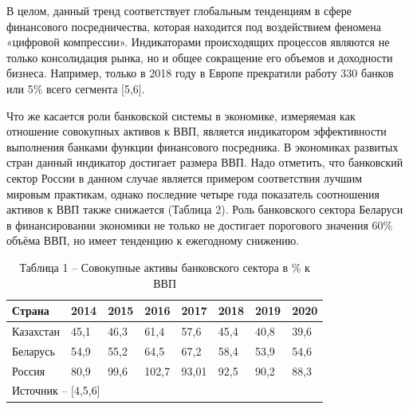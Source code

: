 \begin{multicols}{2}
В целом, данный тренд соответствует глобальным тенденциям в сфере
финансового посредничества, которая находится под воздействием феномена
«цифровой компрессии». Индикаторами происходящих процессов являются не
только консолидация рынка, но и общее сокращение его объемов и
доходности бизнеса. Например, только в 2018 году в Европе прекратили
работу 330 банков или 5\% всего сегмента {[}5,6{]}.

Что же касается роли банковской системы в экономике, измеряемая как
отношение совокупных активов к ВВП, является индикатором эффективности
выполнения банками функции финансового посредника. В экономиках развитых
стран данный индикатор достигает размера ВВП. Надо отметить, что
банковский сектор России в данном случае является примером соответствия
лучшим мировым практикам, однако последние четыре года показатель
соотношения активов к ВВП также снижается (Таблица 2). Роль банковского
сектора Беларуси в финансировании экономики не только не достигает
порогового значения 60\% объёма ВВП, но имеет тенденцию к ежегодному
снижению.
\end{multicols}

\begin{table}[H]
\caption*{Таблица 1 -- Совокупные активы банковского сектора в \% к ВВП}
\centering
\begin{tabular}{|llllllll|}
\hline
\multicolumn{1}{|l|}{Страна} & \multicolumn{1}{l|}{2014} & \multicolumn{1}{l|}{2015} & \multicolumn{1}{l|}{2016} & \multicolumn{1}{l|}{2017} & \multicolumn{1}{l|}{2018} & \multicolumn{1}{l|}{2019} & 2020 \\ \hline
\multicolumn{1}{|l|}{Казахстан} & \multicolumn{1}{l|}{45,1} & \multicolumn{1}{l|}{46,3} & \multicolumn{1}{l|}{61,4} & \multicolumn{1}{l|}{57,6} & \multicolumn{1}{l|}{45,4} & \multicolumn{1}{l|}{40,8} & 39,6 \\ \hline
\multicolumn{1}{|l|}{Беларусь} & \multicolumn{1}{l|}{54,9} & \multicolumn{1}{l|}{55,2} & \multicolumn{1}{l|}{64,5} & \multicolumn{1}{l|}{67,2} & \multicolumn{1}{l|}{58,4} & \multicolumn{1}{l|}{53,9} & 54,6 \\ \hline
\multicolumn{1}{|l|}{Россия} & \multicolumn{1}{l|}{80,9} & \multicolumn{1}{l|}{99,6} & \multicolumn{1}{l|}{102,7} & \multicolumn{1}{l|}{93,01} & \multicolumn{1}{l|}{92,5} & \multicolumn{1}{l|}{90,2} & 88,3 \\ \hline
\multicolumn{8}{|l|}{Источник – {[}4,5,6{]}} \\ \hline
\end{tabular}
\end{table}

